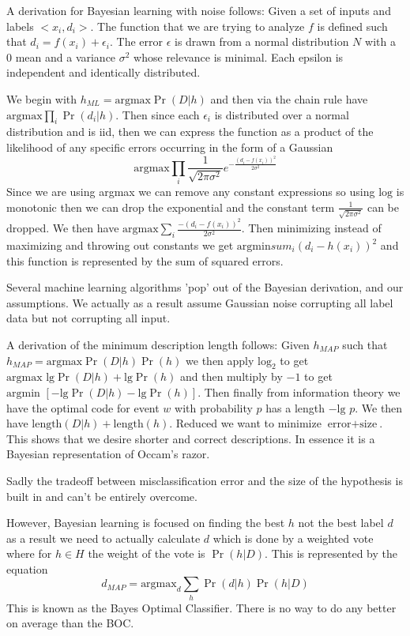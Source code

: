 \documentclass{article}
\begin{document}
A derivation for Bayesian learning with noise follows: Given a set of inputs
and labels $<x_i, d_i>$. The function that we are trying to analyze $f$ is 
defined such that $d_i = f(x_i) + \epsilon_i$. The error $\epsilon$ is drawn 
from a normal distribution $N$ with a $0$ mean and a variance $\sigma^2$ whose
relevance is minimal. Each epsilon is independent and identically distributed. 

We begin with $h_{ML} = \text{argmax} \Pr(D \vert h)$ and then via the chain
rule have $\text{argmax} \prod_i \Pr(d_i \vert h)$. Then since each 
$\epsilon_i$  is distributed over a normal distribution and is iid, then we can
express the function as a product of the likelihood of any specific errors
occurring in the form of a Gaussian $$\text{argmax} \prod_i \frac{1}
{\sqrt{2\pi\sigma^2}} e^{-\frac{(d_i - f(x_i))^2}{2\sigma^2}}$$ Since we are 
using argmax we can remove any constant expressions so using $\text{log}$ is 
monotonic then we can drop the exponential and the constant term $\frac{1}
{\sqrt{2\pi\sigma^2}}$ can be dropped. We then have $\text{argmax} \sum_i
\frac{-(d_i - f(x_i))^2}{2\sigma^2}$. Then minimizing instead of maximizing
and throwing out constants we get $\text{argmin} sum_i (d_i - h(x_i))^2$ and
this function is represented by the sum of squared errors.

Several machine learning algorithms 'pop' out of the Bayesian derivation, and 
our assumptions. We actually as a result assume Gaussian noise corrupting all 
label data but not corrupting all input. 

A derivation of the minimum description length follows: Given $h_{MAP}$ such
that $h_{MAP} = \text{argmax} \Pr(D\vert h) \Pr(h)$ we then apply $\text{log}_2$
to get $\text{argmax} \text{ lg}\Pr(D \vert h) + \text{lg}\Pr(h)$ and then 
multiply by $-1$ to get $\text{argmin }[- \text{lg}\Pr(D\vert h) - \text{lg}\Pr
(h)]$. Then finally from information theory we have the optimal code for event 
$w$ with probability $p$ has a length $-\text{lg }p$. We then have $
\text{length}(D \vert h) + \text{length}(h)$. Reduced we want to minimize
$\text{error} + \text{size}$. This shows that we desire shorter
and correct descriptions. In essence it is a Bayesian representation of Occam's
razor. 

Sadly the tradeoff between misclassification error and the size of the 
hypothesis is built in and can't be entirely overcome. 

However, Bayesian learning is focused on finding the best $h$ not the best label
$d$ as a result we need to actually calculate $d$ which is done by a weighted 
vote where for $h \in H$ the weight of the vote is $\Pr(h \vert D)$. This 
is represented by the equation $$d_{MAP} = \text{argmax}_d \sum_h \Pr(d 
\vert h)\Pr(h \vert D)$$ This is known as the Bayes Optimal Classifier. There
is no way to do any better on average than the BOC.
\end{document}
